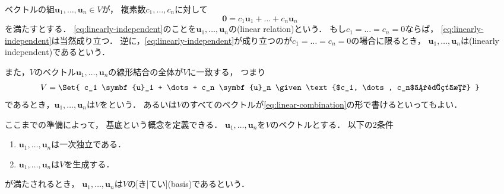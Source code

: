 \documentclass[
]{sotsu}
\begin{document}
ベクトルの組$\symbf{u}_1, \dots, \symbf{u}_n \in V$が，
複素数$c_1, \dots, c_n$に対して
\begin{equation}
    \label{eq:linearly-independent}
    \symbf{0} = c_1 \symbf{u}_1 + \dots + c_n \symbf{u}_n
\end{equation}
を満たすとする．
\cref{eq:linearly-independent}のことを$\symbf{u}_1, \dots, \symbf{u}_n$の(linear relation)という．
もし$c_1 = \dots = c_n = 0$ならば，
\cref{eq:linearly-independent}は当然成り立つ．
逆に，\cref{eq:linearly-independent}が成り立つのが$c_1 = \dots = c_n = 0$の場合に限るとき，
$\symbf{u}_1, \dots, \symbf{u}_n$は(linearly independent)であるという．

また，$V$のベクトル$\symbf{u}_1, \dots, \symbf{u}_n$の線形結合の全体が$V$に一致する，
つまり
\begin{equation*}
    V = \Set{
            c_1 \symbf{u}_1 + \dots + c_n \symbf{u}_n
            \given
            \text{$c_1, \dots, c_n$は複素数}
            }
\end{equation*}
であるとき，$\symbf{u}_1, \dots, \symbf{u}_n$は$V$をという．
あるいは$V$のすべてのベクトルが\cref{eq:linear-combination}の形で書けるといってもよい．

ここまでの準備によって，
基底という概念を定義できる．
$\symbf{u}_1, \dots, \symbf{u}_n$を$V$のベクトルとする．
以下の2条件
\begin{enumerate}
    \item $\symbf{u}_1, \dots, \symbf{u}_n$は一次独立である．
    \item $\symbf{u}_1, \dots, \symbf{u}_n$は$V$を生成する．
\end{enumerate}
が満たされるとき，
$\symbf{u}_1, \dots, \symbf{u}_n$は$V$の[き|てい](basis)であるという．
\end{document}
